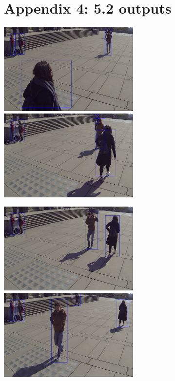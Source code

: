 \documentclass[12pt]{report}
\begin{document}
\section*{Appendix 4: 5.2 outputs}

\includegraphics[width=70mm]{./images/appendix/Video3output1.PNG}
\includegraphics[width=70mm]{./images/appendix/Video3output2.PNG}


\includegraphics[width=70mm]{./images/appendix/Video3output3.PNG}
\includegraphics[width=70mm]{./images/appendix/Video3output4.PNG}
\end{document}
